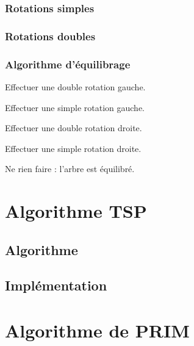 \documentclass{article}
\begin{document}
\subsubsection{Rotations simples}

\subsubsection{Rotations doubles}

\subsubsection{Algorithme d'équilibrage}
\begin{algorithmic}


Effectuer une double rotation gauche.
\Else

Effectuer une simple rotation gauche.

\EndIf
{}


Effectuer une double rotation droite.
\Else

Effectuer une simple rotation droite.
\EndIf
\Else

Ne rien faire : l'arbre est équilibré.
\EndIf
\end{algorithmic}

\section{Algorithme TSP}

\subsection{Algorithme}

\subsection{Implémentation}

\section{Algorithme de PRIM}
\end{document}
